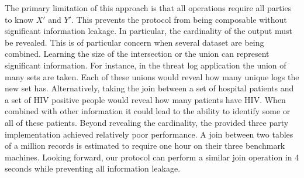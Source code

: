 The primary limitation of this approach is that all operations require all parties to know $X'$ and $Y'$. This prevents the protocol from being composable without significant information leakage. In particular, the cardinality of the output must be revealed. This is of particular concern when several dataset are being combined. Learning the size of the intersection or the union can represent significant information. For instance, in the threat log application the union of many sets are taken. Each of these unions would reveal how many unique logs the new set has. Alternatively, taking the join between a set of hospital patients and a set of HIV positive people would reveal how many patients have HIV. When combined with other information it could lead to the ability to identify some or all of these patients. Beyond revealing the cardinality, the provided three party implementation achieved relatively poor performance. A join between two tables of a million records is estimated to require one hour on their three benchmark machines\cite{LTW13}. Looking forward, our protocol can perform a similar join operation in 4 seconds while preventing all information leakage. 


